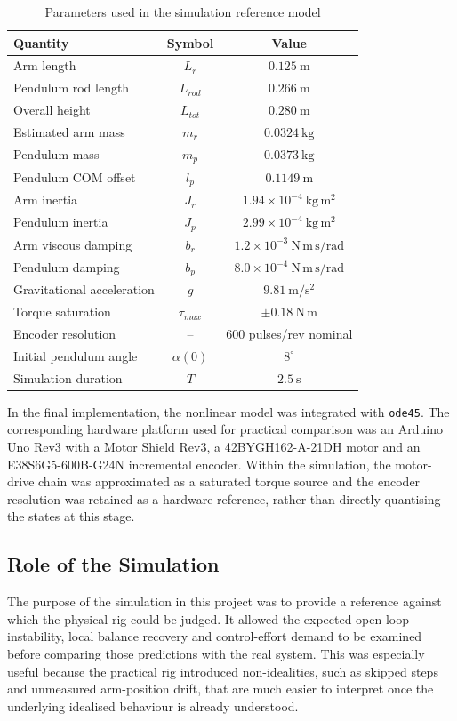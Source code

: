\documentclass[conference]{IEEEtran}
\begin{document}
\begin{table}[!t]
\caption{Parameters used in the simulation reference model}
\label{tab:params}
\centering
\footnotesize
\begin{tabular}{|p{2.45cm}|c|c|}
\hline
Quantity & Symbol & Value \\
\hline
Arm length & $L_{r}$ & $0.125~\mathrm{m}$ \\
\hline
Pendulum rod length & $L_{rod}$ & $0.266~\mathrm{m}$ \\
\hline
Overall height & $L_{tot}$ & $0.280~\mathrm{m}$ \\
\hline
Estimated arm mass & $m_{r}$ & $0.0324~\mathrm{kg}$ \\
\hline
Pendulum mass & $m_{p}$ & $0.0373~\mathrm{kg}$ \\
\hline
Pendulum COM offset & $l_{p}$ & $0.1149~\mathrm{m}$ \\
\hline
Arm inertia & $J_{r}$ & $1.94\times10^{-4}~\mathrm{kg\,m^2}$ \\
\hline
Pendulum inertia & $J_{p}$ & $2.99\times10^{-4}~\mathrm{kg\,m^2}$ \\
\hline
Arm viscous damping & $b_{r}$ & $1.2\times10^{-3}~\mathrm{N\,m\,s/rad}$ \\
\hline
Pendulum damping & $b_{p}$ & $8.0\times10^{-4}~\mathrm{N\,m\,s/rad}$ \\
\hline
Gravitational acceleration & $g$ & $9.81~\mathrm{m/s^{2}}$ \\
\hline
Torque saturation & $\tau_{max}$ & $\pm0.18~\mathrm{N\,m}$ \\
\hline
Encoder resolution & -- & $600$ pulses/rev nominal \\
\hline
Initial pendulum angle & $\alpha(0)$ & $8^\circ$ \\
\hline
Simulation duration & $T$ & $2.5~\mathrm{s}$ \\
\hline
\end{tabular}
\end{table}

In the final implementation, the nonlinear model was integrated with \texttt{ode45}. The corresponding hardware platform used for practical comparison was an Arduino Uno Rev3 with a Motor Shield Rev3, a 42BYGH162-A-21DH motor and an E38S6G5-600B-G24N incremental encoder. Within the simulation, the motor-drive chain was approximated as a saturated torque source and the encoder resolution was retained as a hardware reference, rather than directly quantising the states at this stage.

\subsection{Role of the Simulation}
The purpose of the simulation in this project was to provide a reference against which the physical rig could be judged. It allowed the expected open-loop instability, local balance recovery and control-effort demand to be examined before comparing those predictions with the real system. This was especially useful because the practical rig introduced non-idealities, such as skipped steps and unmeasured arm-position drift, that are much easier to interpret once the underlying idealised behaviour is already understood.
\end{document}
